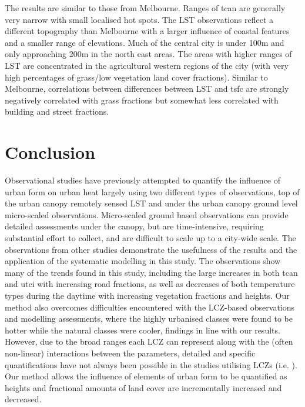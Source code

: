 \documentclass[final,3p,times,authoryear]{elsarticle}
\begin{document}
The results are similar to those from Melbourne. Ranges of \gls{tcan} are generally very narrow with small localised hot spots. The LST observations reflect a different topography than Melbourne with a larger influence of coastal features and a smaller range of elevations. Much of the central city is under 100m and only approaching 200m in the north east areas. The areas with higher ranges of LST are concentrated in the agricultural western regions of the city (with very high percentages of grass/low vegetation land cover fractions). Similar to Melbourne, correlations between differences between LST and \gls{tsfc} are strongly negatively correlated with grass fractions but somewhat less correlated with building and street fractions.


\section{Conclusion}\label{sec:conclusion}

Observational studies have previously attempted to quantify the influence of urban form on urban heat largely using two different types of observations, top of the urban canopy remotely sensed LST and under the urban canopy ground level micro-scaled observations. Micro-scaled ground based observations can provide detailed assessments under the canopy, but are time-intensive, requiring substantial effort to collect, and are difficult to scale up to a city-wide scale. The observations from other studies demonstrate the usefulness of the results and the application of the systematic modelling in this study. The observations show many of the trends found in this study, including the large increases in both \gls{tcan} and \gls{utci} with increasing road fractions, as well as decreases of both temperature types during the daytime with increasing vegetation fractions and heights. Our method also overcomes difficulties encountered with the LCZ-based observations and modelling assessments, where the highly urbanised classes were found to be hotter while the natural classes were cooler, findings in line with our results. However, due to the broad ranges each LCZ can represent along with the (often non-linear) interactions between the parameters, detailed and specific quantifications have not always been possible in the studies utilising LCZs (i.e. \cite{Emery2021}). Our method allows the influence of elements of urban form to be quantified as heights and fractional amounts of land cover are incrementally increased and decreased.
\end{document}
